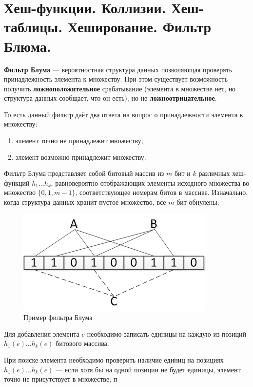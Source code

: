 \section{ Хеш-функции. Коллизии. Хеш-таблицы.  Хеширование. Фильтр Блюма.}

\begin{definition}
	\textbf{Фильтр Блума} --- вероятностная структура данных позволяющая проверять принадлежность элемента к множеству. 
	При этом существует возможность получить \textbf{ложноположительное} срабатывание (элемента в множестве нет, но структура данных сообщает, что он есть), но не \textbf{ложноотрицательное}.
\end{definition}

То есть данный фильтр даёт два ответа на вопрос о принадлежности элемента к множеству:
\begin{enumerate}
	\item элемент точно не принадлежит множеству,
	\item элемент возможно принадлежит множеству.
\end{enumerate}

Фильтр Блума представляет собой битовый массив из $m$
бит и $k$ различных хеш-функций $h_1 ... h_k$, равновероятно отображающих элементы исходного множества во множество $\{0,1, m-1\}$, соответствующее номерам битов в массиве. 
Изначально, когда структура данных хранит пустое множество, все $m$ бит обнулены.

\begin{figure}[h!]
	\centering
	\includegraphics[width=0.4\linewidth]{img_easy/11_1.png}
	\captionsetup{labelformat=empty}
	\caption{Пример фильтра Блума}
\end{figure}

Для добавления элемента $e$ необходимо записать единицы на каждую из позиций $h_1(e)...h_k(e)$ битового массива.

При поиске элемента необходимо проверить наличие единиц на позициях $h_1(e)...h_k(e)$ --- если хотя бы на одной позиции не будет единицы, элемент точно не присутствует в множестве; п